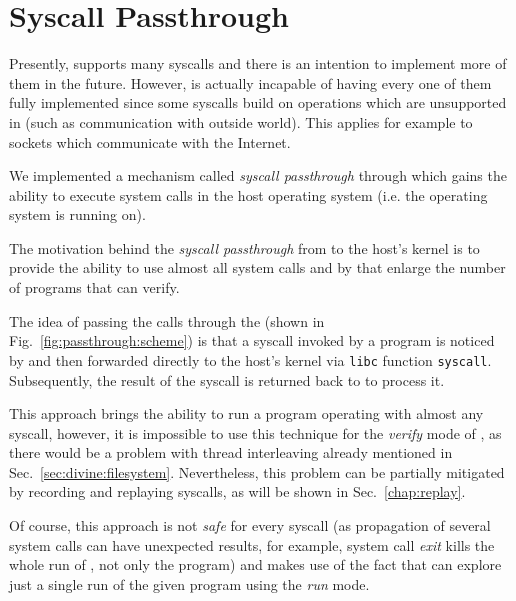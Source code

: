 \newcommand{\vmsyscall}{\texttt{\_\_vm\_syscall}\xspace}

\chapter{Syscall Passthrough } \label{chap:passthrough}

Presently, \divine supports many syscalls and there is an intention to implement more of them in the future. However, \divine is actually incapable of having every one of them fully implemented since some syscalls build on operations which are unsupported in \divine (such as communication with outside world). This applies for example to sockets which communicate with the Internet.

We implemented a mechanism called \textit{syscall passthrough} through which \dios gains the ability to execute system calls in the host operating system (i.e. the operating system \divine is running on).

The motivation behind the \textit{syscall passthrough} from \dios to the host's kernel is to provide the ability to use almost all system calls and by that enlarge the number of programs that \divine can verify.

The idea of passing the calls through the \divine (shown in Fig.~\ref{fig:passthrough:scheme}) is that a syscall invoked by a program is noticed by \dios and then forwarded directly to the host's kernel via \texttt{libc} function \texttt{syscall}. Subsequently, the result of the syscall is returned back to \dios to process it. 

This approach brings the ability to run a program operating with almost any syscall, however, it is impossible to use this technique for the \textit{verify} mode of \divine, as there would be a problem with thread interleaving already mentioned in Sec.~\ref{sec:divine:filesystem}. Nevertheless, this problem can be partially mitigated by recording and replaying syscalls, as will be shown in Sec.~\ref{chap:replay}.

Of course, this approach is not \textit{safe}  for every syscall (as propagation of several system calls can have unexpected results, for example, system call \textit{exit} kills the whole run of \divine, not only the program) and makes use of the fact that \divine can explore just a single run of the given program using the \textit{run} mode.

